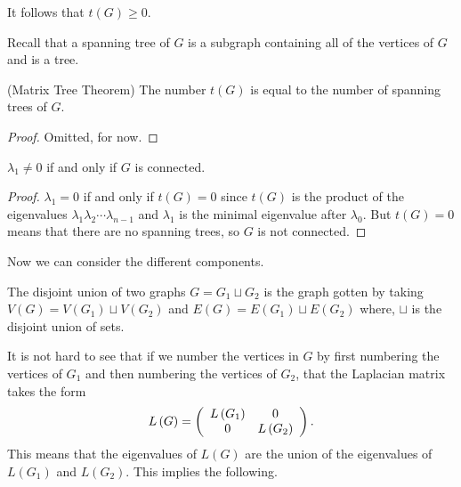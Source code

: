 \begin{remark}
It follows that \(t\left(G\right)\geq0\).
\end{remark}

Recall that a spanning tree of \(G\) is a subgraph containing all of the vertices of \(G\) and is a tree.

\begin{theorem}
(Matrix Tree Theorem) The number \(t\left(  G\right)  \) is equal to the number of spanning trees of \(G\).
\end{theorem}

\begin{proof}
Omitted, for now.
\end{proof}

%
\begin{corollary}
\(\lambda_{1}\neq0\) if and only if \(G\) is connected.
\end{corollary}

\begin{proof}
\(\lambda_{1}=0\) if and only if \(t\left(G\right)=0\) since \(t\left(G\right)\) is the product of the eigenvalues \(\lambda_{1}\lambda_{2}\cdots\lambda_{n-1}\) and \(\lambda_{1}\) is the minimal eigenvalue after \(\lambda_{0}\).
But \(t\left(G\right)=0\) means that there are no spanning trees, so \(G\) is not connected.
\end{proof}

Now we can consider the different components.

\begin{definition}
The disjoint union of two graphs \(G=G_{1}\sqcup G_{2}\) is the graph gotten by taking \(V\left(G\right)=V\left(G_{1}\right)\sqcup V\left(G_{2}\right)\) and \(E\left(G\right)=E\left(G_{1}\right)\sqcup E\left(G_{2}\right)\) where, \(\sqcup\) is the disjoint union of sets.
\end{definition}

It is not hard to see that if we number the vertices in \(G\) by first numbering the vertices of \(G_{1}\) and then numbering the vertices of \(G_{2}\), that the Laplacian matrix takes the form%
\[
L\left(  G\right)  =\left(
\begin{array}
[c]{cc}%
L\left(G_{1}\right) & 0\\
0 & L\left(G_{2}\right)
\end{array}
\right).
\]
This means that the eigenvalues of \(L\left(G\right)\) are the union of the eigenvalues of \(L\left(G_{1}\right)\) and \(L\left(G_{2}\right)\).
This implies the following.

